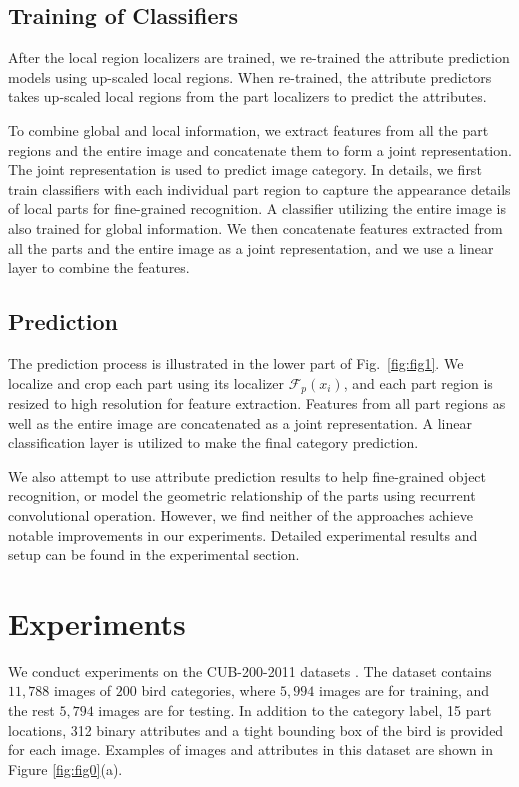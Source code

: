 \documentclass{article}
\begin{document}
\subsection{Training of Classifiers}
After the local region localizers are trained, we re-trained the attribute prediction models using up-scaled local regions.
When re-trained, the attribute predictors takes up-scaled local regions from the part localizers to predict the attributes.

To combine global and local information, we extract features from all the part regions and the entire image and concatenate them to form a joint representation. The joint representation is used to predict image category.
In details, we first train classifiers with each individual part region to capture the appearance details of local parts for fine-grained recognition.
A classifier utilizing the entire image is also trained for global information.
We then concatenate features extracted from all the parts and the entire image as a joint representation, and we use a linear layer to combine the features.


\subsection{Prediction}
The prediction process is illustrated in the lower part of Fig.~\ref{fig:fig1}.
We localize and crop each part using its localizer $\mathcal{F}_p(x_i)$,
and each part region is resized to high resolution for feature extraction.
Features from all part regions as well as the entire image are concatenated as a joint representation. A linear classification  layer is utilized to make the final category prediction.

We also attempt to use attribute prediction results to help fine-grained object recognition, or model the geometric relationship of the parts using recurrent convolutional operation.
However, we find neither of the approaches achieve notable improvements in our experiments.
Detailed experimental results and setup can be found in the experimental section.

\section{Experiments}
We conduct experiments on the CUB-200-2011 datasets \cite{bd6}. The dataset contains $11,788$ images of $200$ bird categories, where $5,994$ images are for training, and the rest $5,794$ images are for testing.
In addition to the category label, 15 part locations, 312 binary attributes and a tight bounding box of the bird is provided for each image. Examples of images and attributes in this dataset are shown in Figure \ref{fig:fig0}(a).
\end{document}

